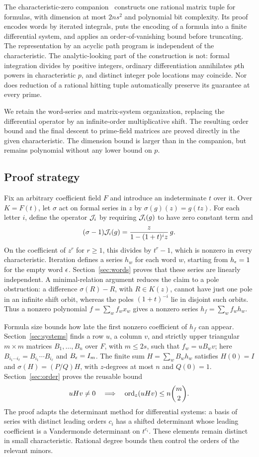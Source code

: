 The characteristic-zero companion~\cite[Theorem~1.1]{OAInc} constructs one
rational matrix tuple for formulas, with dimension at most $2ns^2$ and
polynomial bit complexity. Its proof encodes words by iterated integrals,
puts the encoding of a formula into a finite differential system, and
applies an order-of-vanishing bound before truncating. The representation
by an acyclic path program is independent of the characteristic. The
analytic-looking part of the construction is not: formal integration
divides by positive integers, ordinary differentiation annihilates
$p$th powers in characteristic $p$, and distinct integer pole locations
may coincide. Nor does reduction of a rational hitting tuple automatically
preserve its guarantee at every prime.

We retain the word-series and matrix-system organization, replacing the
differential operator by an infinite-order multiplicative shift. The
resulting order bound and the final descent to prime-field matrices are
proved directly in the given characteristic. The dimension bound is larger
than in the companion, but remains polynomial without any lower bound on $p$.

\subsection{Proof strategy}

Fix an arbitrary coefficient field $F$ and introduce an indeterminate $t$
over it. Over $K=F(t)$, let $\sigma$ act on formal series in $z$ by
$\sigma(g)(z)=g(tz)$. For each letter $i$, define the operator $\mathcal J_i$ by
requiring $\mathcal J_i(g)$ to have zero constant term and
\[
 (\sigma-1)\mathcal J_i(g)=\frac{z}{1-(1+t)^i z}\,g.
\]
On the coefficient of $z^r$ for $r\ge1$, this divides by $t^r-1$, which is nonzero
in every characteristic. Iteration defines a series $h_w$ for each word
$w$, starting from $h_\epsilon=1$ for the empty word $\epsilon$.
Section~\ref{sec:words} proves that these series are linearly independent.
A minimal-relation argument reduces the claim to a pole obstruction:
a difference $\sigma(R)-R$, with $R\in K(z)$, cannot have just one pole
in an infinite shift orbit,
whereas the poles $(1+t)^{-i}$ lie in disjoint such orbits.
Thus a nonzero polynomial $f=\sum_w f_wx_w$ gives a
nonzero series $h_f=\sum_w f_wh_w$.

Formula size bounds how late the first nonzero coefficient of $h_f$ can
appear. Section~\ref{sec:systems} finds a row $u$, a column $v$, and
strictly upper triangular $m\times m$ matrices $B_1,\ldots,B_n$ over $F$,
with $m\le2s$, such that $f_w=uB_wv$; here
$B_{i_1\cdots i_\ell}=B_{i_1}\cdots B_{i_\ell}$ and $B_\epsilon=I_m$.
The finite sum $H=\sum_w B_wh_w$ satisfies $H(0)=I$ and
$\sigma(H)=(P/Q)H$, with $z$-degrees at most $n$ and $Q(0)=1$.
Section~\ref{sec:order} proves the reusable bound
\[
 uHv\ne0\quad\Longrightarrow\quad
 \operatorname{ord}_z(uHv)\le n\binom m2.
\]
The proof adapts the determinant method for differential systems: a basis
of series with distinct leading orders $c_i$ has a shifted determinant
whose leading coefficient is a Vandermonde determinant on $t^{c_i}$.
These elements remain distinct in small characteristic. Rational degree
bounds then control the orders of the relevant minors.

